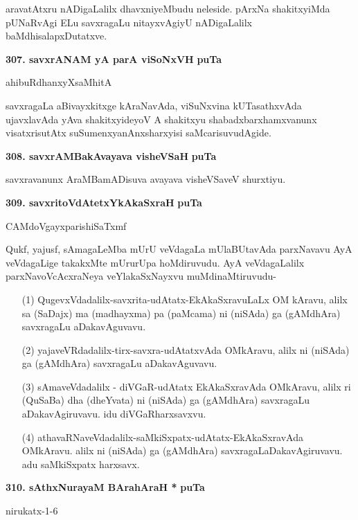 aravatAtxru nADigaLalilx dhavxniyeMbudu neleside. pArxNa shakitxyiMda pUNaRvAgi ELu savxragaLu nitayxvAgiyU nADigaLalilx baMdhisalapxDutatxve.

\eject

\textbf{307. savxrANAM yA parA viSoNxVH} \hfill {\bf puTa \pageref{152e}}

\hfill ahibuRdhanxyXsaMhitA

\smallskip
savxragaLa aBivayxkitxge kAraNavAda, viSuNxvina kUTasathxvAda ujavxlavAda yAva shakitxyideyoV A shakitxyu shabadxbarxhamxvanunx visatxrisutAtx suSumenxyanAnxsharxyisi saMcarisuvudAgide.

\medskip
\noindent
\textbf{308. savxrAMBakAvayava visheVSaH} \hfill {\bf puTa \pageref{172}}

\smallskip
savxravanunx AraMBamADisuva avayava visheVSaveV shurxtiyu.

\medskip
\noindent
\textbf{309. savxritoVdAtetxYkAkaSxraH} \hfill {\bf puTa \pageref{156c}}

\hfill CAMdoVgayxparishiSaTxmf

\smallskip
Qukf, yajusf, sAmagaLeMba mUrU veVdagaLa mUlaBUtavAda parxNavavu AyA veVdagaLige takakxMte mUrurUpa hoMdiruvudu. AyA veVdagaLalilx parxNavoVcAcxraNeya veYlakaSxNayxvu muMdinaMtiruvudu-

\begin{itemize}
\item[(1)] QugevxVdadalilx-savxrita-udAtatx-EkAkaSxravuLaLx OM kAravu, alilx sa (SaDajx) ma (madhayxma) pa (paMcama) ni (niSAda) ga (gAMdhAra) savxragaLu aDakavAguvavu.

\item[(2)] yajaveVRdadalilx-tirx-savxra-udAtatxvAda OMkAravu, alilx ni (niSAda) ga (gAMdhAra) savxragaLu aDakavAguvavu.

\item[(3)] sAmaveVdadalilx - diVGaR-udAtatx EkAkaSxravAda OMkAravu, alilx ri (QuSaBa) dha (dheYvata) ni (niSAda) ga (gAMdhAra) savxragaLu aDakavAgiruvavu. idu diVGaRharxsavxvu.

\item[(4)] athavaRNaveVdadalilx-saMkiSxpatx-udAtatx-EkAkaSxravAda OMkAravu. alilx ni (niSAda) ga (gAMdhAra) savxragaLaDakavAgiruvavu. adu saMkiSxpatx harxsavx. 

\end{itemize}

\noindent
\textbf{310. sAthxNurayaM BArahAraH *} \hfill {\bf puTa \pageref{39}}

\hfill nirukatx-1-6

